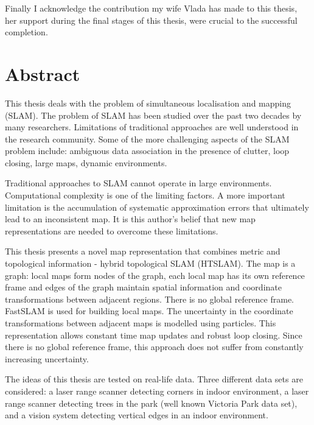 \documentclass[11pt,onecolum,a4paper,oneside]{book}
\begin{document}
Finally I acknowledge the contribution my wife Vlada has made to this
thesis, her support during the final stages of this thesis, were
crucial to the successful completion.







\chapter*{Abstract}  %

This thesis deals with the problem of simultaneous localisation and
mapping (SLAM). The problem of SLAM has been studied over the past two
decades by many researchers. Limitations of traditional approaches are
well understood in the research community. Some of the more
challenging aspects of the SLAM problem include: ambiguous data
association in the presence of clutter, loop closing, large maps,
dynamic environments.

Traditional approaches to SLAM cannot operate in large
environments. Computational complexity is one of the limiting
factors. A more important limitation is the accumulation of systematic
approximation errors that ultimately lead to an inconsistent map. It is
this author's belief that new map representations are needed to
overcome these limitations.

This thesis presents a novel map representation that combines metric
and topological information - hybrid topological SLAM (HTSLAM). The
map is a graph: local maps form nodes of the graph, each local map has
its own reference frame and edges of the graph maintain spatial
information and coordinate transformations between adjacent
regions. There is no global reference frame. FastSLAM is used for
building local maps. The uncertainty in the coordinate transformations
between adjacent maps is modelled using particles. This representation
allows constant time map updates and robust loop closing. Since there
is no global reference frame, this approach does not suffer from
constantly increasing uncertainty.

The ideas of this thesis are tested on real-life data. Three different
data sets are considered: a laser range scanner detecting corners in
indoor environment, a laser range scanner detecting trees in the park
(well known Victoria Park data set), and a vision system detecting
vertical edges in an indoor environment.
\end{document}
